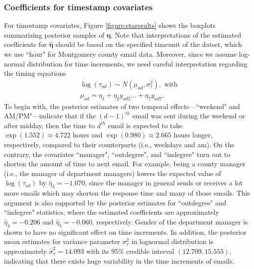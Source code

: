 \documentclass[ba]{imsart}
\numberwithin{equation}{section}
\theoremstyle{plain}
\begin{document}
		\subsubsection{Coefficients for timestamp covariates}
	For timestamp covariates, Figure \ref{figure:etaresults} shows the boxplots summarizing posterior samples of $\boldsymbol{\eta}$. Note that interpretations of the estimated coefficients for $\hat{\boldsymbol{\eta}}$ should be based on the specified timeunit of the datset, which we use ``hour" for Montgomery county email data. Moreover, since we assume log-normal distribution for time increments, we need careful interpretation regarding the timing equations
	\begin{equation*}
	\begin{aligned}
	&\log(\tau_{ad}) \sim N(\mu_{ad}, \sigma_\tau^2), \mbox{ with }\\
	&\mu_{ad} = \eta_{1}+\eta_{2} y_{ad2}\ldots+\eta_{7}y_{ad7}.
	\end{aligned}
	\end{equation*}
	To begin with, the posterior estimates of two temporal effects---``weekend" and 		AM/PM"---indicate that if the ${(d-1)}^{th}$ email was sent during the weekend or after midday, then the time to $d^{th}$ email is expected to take $\exp(1.552)\approx 4.722$ hours and $\exp(0.980)\approx2.665$ hours longer, respectively, compared to their counterparts (i.e., weekdays and am). On the contrary, the covariates ``manager", ``outdegree", and ``indegree" turn out to shorten the amount of time to next email. For example, being a county manager (i.e., the manager of department managers) lowers the expected value of $\log(\tau_{ad})$ by $\hat{\eta}_3 = -1.070$, since the manager in general sends or receives a lot more emails which may shorten the response time and many of those emails. This argument is also supported by the posterior estimates for ``outdegree" and ``indegree" statistics, where the estimated coefficients are approximately $\hat{\eta}_4=-0.206$ and $\hat{\eta}_5=-0.060$, respectively. Gender of the department manager is shown to have no significant effect on time increments. In addition, the posterior mean estimates for variance parameter $\sigma^2_\tau$ in lognormal distribution is approximately $\hat{\sigma}^2_\tau=14.093$ with its 95\% credible interval $(12.709, 15.555)$, indicating that there exists huge variability in the time increments of emails.
\end{document}
